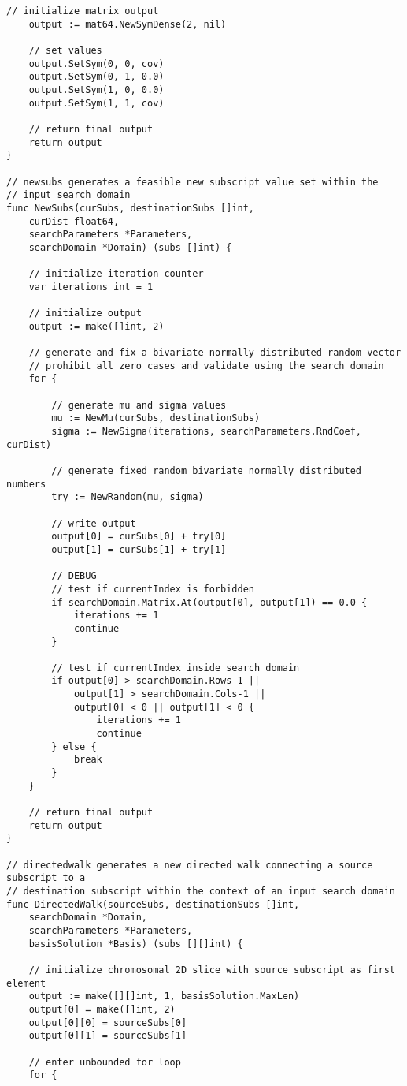 \begin{lstlisting}[basicstyle=\tiny]
	// initialize matrix output
	output := mat64.NewSymDense(2, nil)

	// set values
	output.SetSym(0, 0, cov)
	output.SetSym(0, 1, 0.0)
	output.SetSym(1, 0, 0.0)
	output.SetSym(1, 1, cov)

	// return final output
	return output
}

// newsubs generates a feasible new subscript value set within the
// input search domain
func NewSubs(curSubs, destinationSubs []int, 
    curDist float64, 
    searchParameters *Parameters, 
    searchDomain *Domain) (subs []int) {

	// initialize iteration counter
	var iterations int = 1

	// initialize output
	output := make([]int, 2)

	// generate and fix a bivariate normally distributed random vector
	// prohibit all zero cases and validate using the search domain
	for {

		// generate mu and sigma values
		mu := NewMu(curSubs, destinationSubs)
		sigma := NewSigma(iterations, searchParameters.RndCoef, curDist)

		// generate fixed random bivariate normally distributed numbers
		try := NewRandom(mu, sigma)

		// write output
		output[0] = curSubs[0] + try[0]
		output[1] = curSubs[1] + try[1]

		// DEBUG
		// test if currentIndex is forbidden
		if searchDomain.Matrix.At(output[0], output[1]) == 0.0 {
			iterations += 1
			continue
		}

		// test if currentIndex inside search domain
		if output[0] > searchDomain.Rows-1 || 
		    output[1] > searchDomain.Cols-1 || 
		    output[0] < 0 || output[1] < 0 {
			    iterations += 1
			    continue
		} else {
			break
		}
	}

	// return final output
	return output
}

// directedwalk generates a new directed walk connecting a source subscript to a
// destination subscript within the context of an input search domain
func DirectedWalk(sourceSubs, destinationSubs []int, 
    searchDomain *Domain, 
    searchParameters *Parameters, 
    basisSolution *Basis) (subs [][]int) {

	// initialize chromosomal 2D slice with source subscript as first element
	output := make([][]int, 1, basisSolution.MaxLen)
	output[0] = make([]int, 2)
	output[0][0] = sourceSubs[0]
	output[0][1] = sourceSubs[1]

	// enter unbounded for loop
	for {


\end{lstlisting}
